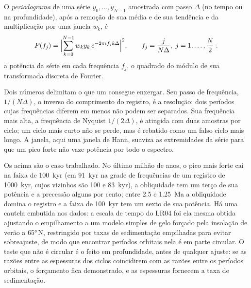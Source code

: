 \begin{definition}[Periodograma]\label{def:b3:sequence-stratigraphy:periodogram}
O \emph{periodograma} de uma série $y_0, \dots, y_{N-1}$
amostrada com passo $\Delta$ (no tempo ou na profundidade), após a remoção de sua média e
de sua tendência e da multiplicação por uma janela $w_k$, é
\[
P(f_j) = \Bigl|\sum_{k=0}^{N-1} w_k y_k\, e^{-2\pi i f_j k\Delta}\Bigr|^2,
\qquad f_j = \frac{j}{N\Delta},\ j = 1, \dots, \frac N2:
\]
a potência da série em cada frequência $f_j$, o quadrado do módulo de
sua transformada discreta de Fourier.
\end{definition}

Dois números delimitam o que um  consegue enxergar. Seu passo de frequência, $1/(N\Delta)$,
o inverso do comprimento do registro, é a resolução: dois períodos cujas
frequências diferem em menos não podem ser separados. Sua frequência mais alta, a
frequência de Nyquist $1/(2\Delta)$, é atingida com duas amostras por ciclo; um
ciclo mais curto não se perde, mas é rebatido como um falso ciclo mais longo. A janela,
aqui uma janela de Hann, suaviza as extremidades da série para que um pico forte não
vaze potência por todo o espectro.


Os  acima são o caso trabalhado. No último milhão de anos, o pico mais forte
cai na faixa de \qty{100}{kyr} (em \qty{91}{kyr} na grade de frequências
de um registro de \qty{1000}{kyr}, cujos vizinhos são 100 e \qty{83}{kyr}),
a obliquidade tem um terço de sua potência e a precessão alguns por cento;
entre 2.5 e \qty{1.25}{Ma} a obliquidade domina o registro e a
faixa de \qty{100}{kyr} tem um sexto de sua potência. Há uma cautela embutida nos
dados: a escala de tempo do LR04 foi ela mesma obtida ajustando o empilhamento a um modelo simples
de gelo forçado pela insolação de verão a \ang{65}\,N, restringido por
taxas de sedimentação empilhadas para evitar sobreajuste, de modo que encontrar períodos orbitais nela
é em parte circular. O teste que não é circular é o feito em profundidade,
antes de qualquer ajuste: se as razões entre as espessuras dos ciclos coincidirem com as
razões entre os períodos orbitais, o forçamento fica demonstrado, e as espessuras fornecem
a taxa de sedimentação.

